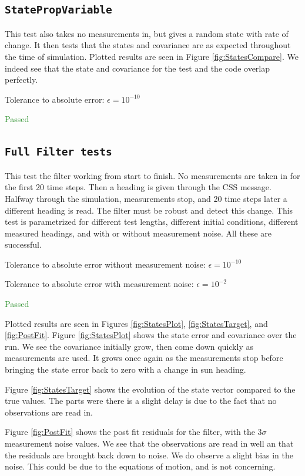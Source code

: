 \documentclass[]{BasiliskReportMemo}
\begin{document}


\subsection{\texttt{StatePropVariable}}

This test also takes no measurements in, but gives a random state with rate of change. It then tests that the states and covariance are as expected throughout the time of simulation. Plotted results are seen in Figure \ref{fig:StatesCompare}. We indeed see that the state and covariance for the test and the code overlap perfectly.

Tolerance to absolute error: $\epsilon = 10^{-10}$

\textcolor{ForestGreen}{Passed}


\subsection{\texttt{Full Filter tests}}

This test the filter working from start to finish. No measurements are taken in for the first 20 time steps. Then a heading is given through the CSS message. Halfway through the simulation, measurements stop, and 20 time steps later a different heading is read. The filter must be robust and detect this change. This test is parametrized for different test lengths, different initial conditions, different measured headings, and with or without measurement noise. All these are successful.

\vspace{0.2cm}
Tolerance to absolute error without measurement noise: $\epsilon = 10^{-10}$

Tolerance to absolute error with measurement noise: $\epsilon = 10^{-2}$

\textcolor{ForestGreen}{Passed}

Plotted results are seen in Figures \ref{fig:StatesPlot}, \ref{fig:StatesTarget}, and \ref{fig:PostFit}. Figure \ref{fig:StatesPlot} shows the state error and covariance over the run. We see the covariance initially grow, then come down quickly as measurements are used. It grows once again as the measurements stop before bringing the state error back to zero with a change in sun heading. 

Figure \ref{fig:StatesTarget} shows the evolution of the state vector compared to the true values. The parts were there is a slight delay is due to the fact that no observations are read in. 

Figure \ref{fig:PostFit} shows the post fit residuals for the filter, with the $3\sigma$ measurement noise values. We see that the observations are read in well an that the residuals are brought back down to noise. We do observe a slight bias in the noise. This could be due to the equations of motion, and is not concerning.





\end{document}
